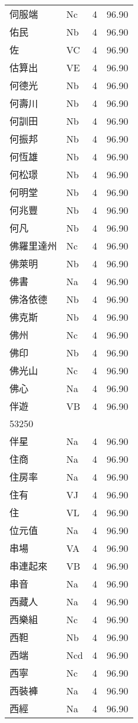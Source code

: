 \documentclass[twocolumn]{book}
\begin{document}
\begin{supertabular}{llrr}
伺服端 & Nc & 4 &  96.90\\
佑民 & Nb & 4 &  96.90\\
佐 & VC & 4 &  96.90\\
估算出 & VE & 4 &  96.90\\
何德光 & Nb & 4 &  96.90\\
何壽川 & Nb & 4 &  96.90\\
何訓田 & Nb & 4 &  96.90\\
何振邦 & Nb & 4 &  96.90\\
何恆雄 & Nb & 4 &  96.90\\
何松璟 & Nb & 4 &  96.90\\
何明堂 & Nb & 4 &  96.90\\
何兆豐 & Nb & 4 &  96.90\\
何凡 & Nb & 4 &  96.90\\
佛羅里達州 & Nc & 4 &  96.90\\
佛萊明 & Nb & 4 &  96.90\\
佛書 & Na & 4 &  96.90\\
佛洛依德 & Nb & 4 &  96.90\\
佛克斯 & Nb & 4 &  96.90\\
佛州 & Nc & 4 &  96.90\\
佛印 & Nb & 4 &  96.90\\
佛光山 & Nc & 4 &  96.90\\
佛心 & Na & 4 &  96.90\\
伴遊 & VB & 4 &  96.90\\
53250\\
伴星 & Na & 4 &  96.90\\
住商 & Na & 4 &  96.90\\
住房率 & Na & 4 &  96.90\\
住有 & VJ & 4 &  96.90\\
住 & VL & 4 &  96.90\\
位元值 & Na & 4 &  96.90\\
串場 & VA & 4 &  96.90\\
串連起來 & VB & 4 &  96.90\\
串音 & Na & 4 &  96.90\\
西藏人 & Na & 4 &  96.90\\
西樂組 & Nc & 4 &  96.90\\
西靼 & Nb & 4 &  96.90\\
西端 & Ncd & 4 &  96.90\\
西寧 & Nc & 4 &  96.90\\
西裝褲 & Na & 4 &  96.90\\
西經 & Na & 4 &  96.90\\

\end{supertabular}
\end{document}
